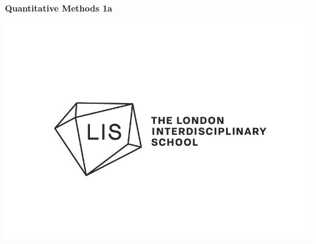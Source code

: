 \documentclass[12pt]{article}
\theoremstyle{plain}
\begin{document}
\vspace*{-2.5 cm}

\begin{minipage}{0.6\textwidth}
    \begin{flushleft}
        \hspace*{-0.5cm}\textbf{Quantitative Methods 1a}\\
    \end{flushleft}
\end{minipage}
\begin{minipage}{0.36\textwidth}
    \begin{flushright}
        \includegraphics[scale=0.2]{Full Logo Black.png}
    \end{flushright}
\end{minipage}



% 
% 
\end{document}
